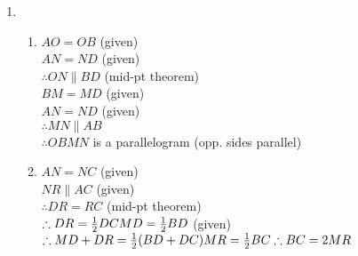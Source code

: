 \begin{eocsolutions}{}
{\begin{enumerate}[itemsep=5pt, label=\textbf{\arabic*}. ]
\item %
 \begin{enumerate}[noitemsep, label=\textbf{(\alph*)} ]
\item
$AO=OB$ (given)\\
$AN=ND$ (given)\\
$\therefore ON\parallel BD$ (mid-pt theorem)\\
$BM=MD$ (given)\\
$AN=ND$ (given)\\
$\therefore MN \parallel AB$\\
$\therefore OBMN$ is a parallelogram (opp. sides parallel)
\item 
$AN=NC$ (given)\\
$NR \parallel AC$ (given)\\
$\therefore DR=RC$ (mid-pt theorem)\\
$\therefore DR=\frac{1}{2} DC\\
MD=\frac{1}{2}BD$ (given)\\
$\therefore MD + DR = \frac{1}{2} (BD+DC)\\
MR = \frac{1}{2}BC\\
\therefore BC = 2MR$
\end{enumerate}


\end{enumerate}}
\end{eocsolutions}
